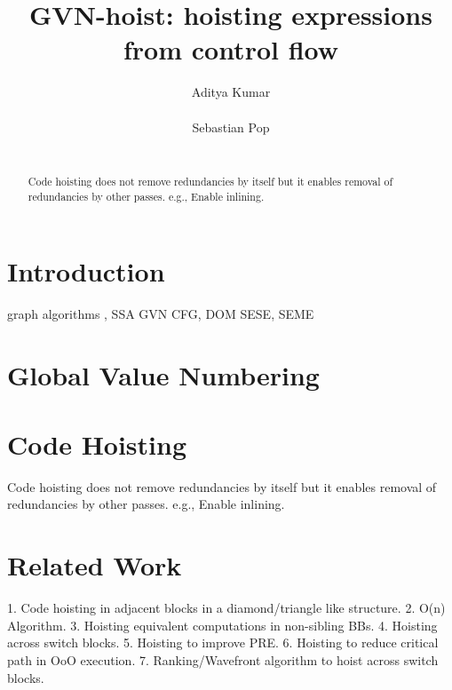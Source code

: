\documentclass{sig-alternate}
\begin{document}
\def \SCoP {SCoP}
\def \GCC {GCC}
\def \LLVM {LLVM}
\def \SESE {SESE}
\def \CFG {CFG}
\def \SSA {SSA}
\def \scev {scev}

\setlength{\pdfpageheight}{\paperheight}
\setlength{\pdfpagewidth}{\paperwidth}

\title{GVN-hoist: hoisting expressions from control flow}


\author{
\alignauthor
Aditya Kumar\\
       \\
\alignauthor
Sebastian Pop\\
       \\
}

\maketitle
\begin{abstract}
Code hoisting does not remove redundancies by itself but it enables
removal of redundancies by other passes.  e.g., Enable inlining.
\end{abstract}

\section{Introduction}

graph algorithms \cite{tarjan},
SSA \cite{cytron}
GVN \cite{rosen1988global,click1995global}
CFG, DOM \cite{dragonbook}
SESE, SEME \cite{sese}

\section{Global Value Numbering}
\section{Code Hoisting}
Code hoisting does not remove redundancies by itself but it enables
removal of redundancies by other passes.  e.g., Enable inlining.
\section{Related Work}


1. Code hoisting in adjacent blocks in a diamond/triangle like structure.
2. O(n) Algorithm.
3. Hoisting equivalent computations in non-sibling BBs.
4. Hoisting across switch blocks.
5. Hoisting to improve PRE.
6. Hoisting to reduce critical path in OoO execution.
7. Ranking/Wavefront algorithm to hoist across switch blocks.
\end{document}
